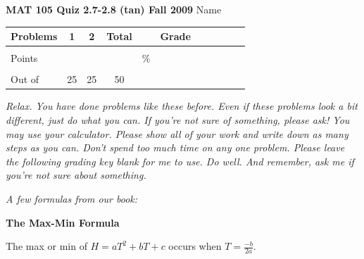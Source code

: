 \documentclass[11pt]{article}
\begin{document}
{\bf MAT 105 Quiz 2.7-2.8 (tan) Fall 2009} \hspace{.4in} {\large Name} \hrulefill

\hrulefill


\begin{center}

\begin{tabular}
{|l|c|c|c|c|c|c|c|c|c|c|} \hline

 Problems & \hspace{5 pt} 1 \hspace{5 pt}  & \hspace{5 pt} 2 \hspace{5 pt} &  \hspace{5 pt} Total  \hspace{5 pt} & &  \hspace{5 pt} Grade \hspace{5 pt}  \\ \hline
&&& &&\\  
Points &&& &    \hspace{.8in}\% &  \\ 
&&& && \\  \hline
Out of & 25 & 25  &50 & & \\ \hline

\end {tabular}
 
\end{center}

 \emph{Relax.  You have done problems like these before.  Even if these problems look a bit different, just do what you can.  If you're not sure of something, please ask! You may use your calculator.  Please show all of your work and write down as many steps as you can.  Don't spend too much time on any one problem.  Please leave the following grading key blank for me to use.  Do well.  And remember, ask me if you're not sure about something.}
 
 \vspace{.1in}
 
 \emph{A few formulas from our book:}
  \vspace{.2in}
 
  \begin{center}
\textbf{The Max-Min Formula}
\vspace{.1in}

The max or min of $H=aT^2+bT+c$ occurs when $\displaystyle T=\frac{-b}{2a}$.

 \end{center}
 
\end{document}
